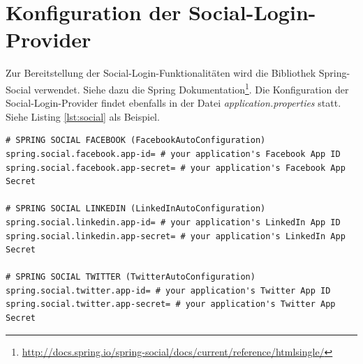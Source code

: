 \section{Konfiguration der Social-Login-Provider}\label{s_config_social}
Zur Bereitstellung der Social-Login-Funktionalitäten wird die Bibliothek Spring-Social verwendet. Siehe dazu die Spring Dokumentation\footnote{\url{http://docs.spring.io/spring-social/docs/current/reference/htmlsingle/}}.
Die Konfiguration der Social-Login-Provider findet ebenfalls in der Datei \emph{application.properties} statt.
Siehe Listing \ref{lst:social} als Beispiel.
   \begin{lstlisting}[caption={Konfiguration der Social-Login-Provider},label={lst:social}]
# SPRING SOCIAL FACEBOOK (FacebookAutoConfiguration)
spring.social.facebook.app-id= # your application's Facebook App ID
spring.social.facebook.app-secret= # your application's Facebook App Secret

# SPRING SOCIAL LINKEDIN (LinkedInAutoConfiguration)
spring.social.linkedin.app-id= # your application's LinkedIn App ID
spring.social.linkedin.app-secret= # your application's LinkedIn App Secret

# SPRING SOCIAL TWITTER (TwitterAutoConfiguration)
spring.social.twitter.app-id= # your application's Twitter App ID
spring.social.twitter.app-secret= # your application's Twitter App Secret
   \end{lstlisting}